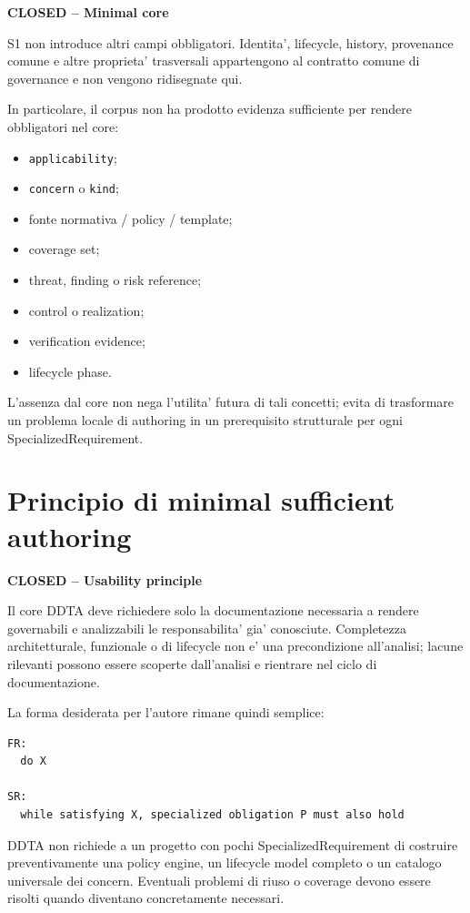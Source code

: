 \documentclass[11pt,a4paper]{article}
\newcommand{\closed}{\textbf{CLOSED}}
\newenvironment{statusbox}[1]{%
  \def\FrameCommand{\fcolorbox{ddtablue}{ddtagray}}%
  \MakeFramed{\advance\hsize-2\width\FrameRestore}
  \noindent\textbf{#1}\par\smallskip
}{\endMakeFramed}
\begin{document}
\begin{statusbox}{\closed{} -- Minimal core}
S1 non introduce altri campi obbligatori. Identita', lifecycle, history, provenance comune e altre proprieta' trasversali appartengono al contratto comune di governance e non vengono ridisegnate qui.
\end{statusbox}

In particolare, il corpus non ha prodotto evidenza sufficiente per rendere obbligatori nel core:
\begin{itemize}
  \item \texttt{applicability};
  \item \texttt{concern} o \texttt{kind};
  \item fonte normativa / policy / template;
  \item coverage set;
  \item threat, finding o risk reference;
  \item control o realization;
  \item verification evidence;
  \item lifecycle phase.
\end{itemize}

L'assenza dal core non nega l'utilita' futura di tali concetti; evita di trasformare un problema locale di authoring in un prerequisito strutturale per ogni SpecializedRequirement.

\section{Principio di minimal sufficient authoring}

\begin{statusbox}{\closed{} -- Usability principle}
Il core DDTA deve richiedere solo la documentazione necessaria a rendere governabili e analizzabili le responsabilita' gia' conosciute. Completezza architetturale, funzionale o di lifecycle non e' una precondizione all'analisi; lacune rilevanti possono essere scoperte dall'analisi e rientrare nel ciclo di documentazione.
\end{statusbox}

La forma desiderata per l'autore rimane quindi semplice:

\begin{verbatim}
FR:
  do X

SR:
  while satisfying X, specialized obligation P must also hold
\end{verbatim}

DDTA non richiede a un progetto con pochi SpecializedRequirement di costruire preventivamente una policy engine, un lifecycle model completo o un catalogo universale dei concern. Eventuali problemi di riuso o coverage devono essere risolti quando diventano concretamente necessari.
\end{document}
